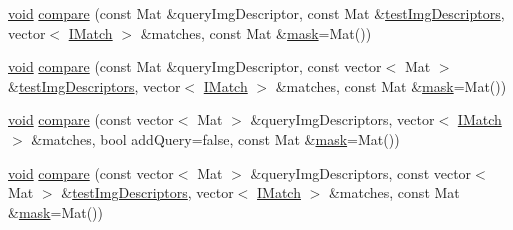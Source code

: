 \begin{DoxyCompactItemize}
\item 
\hyperlink{legacy_8hpp_a8bb47f092d473522721002c86c13b94e}{void} \hyperlink{classcv_1_1of2_1_1FabMap_ab1d5d6016bb012155090dd2d17085463}{compare} (const Mat \&query\-Img\-Descriptor, const Mat \&\hyperlink{classcv_1_1of2_1_1FabMap_a46f350e86965ec1e00ae4bd629dd4c8d}{test\-Img\-Descriptors}, vector$<$ \hyperlink{structcv_1_1of2_1_1IMatch}{I\-Match} $>$ \&matches, const Mat \&\hyperlink{tracking_8hpp_a6b13ecd2fd6ec7ad422f1d7863c3ad19}{mask}=Mat())
\item 
\hyperlink{legacy_8hpp_a8bb47f092d473522721002c86c13b94e}{void} \hyperlink{classcv_1_1of2_1_1FabMap_a1f7bf108d1fb50ed80d96e61982f5d2c}{compare} (const Mat \&query\-Img\-Descriptor, const vector$<$ Mat $>$ \&\hyperlink{classcv_1_1of2_1_1FabMap_a46f350e86965ec1e00ae4bd629dd4c8d}{test\-Img\-Descriptors}, vector$<$ \hyperlink{structcv_1_1of2_1_1IMatch}{I\-Match} $>$ \&matches, const Mat \&\hyperlink{tracking_8hpp_a6b13ecd2fd6ec7ad422f1d7863c3ad19}{mask}=Mat())
\item 
\hyperlink{legacy_8hpp_a8bb47f092d473522721002c86c13b94e}{void} \hyperlink{classcv_1_1of2_1_1FabMap_a38b53d2849eceee3bf4a8b9a9500f456}{compare} (const vector$<$ Mat $>$ \&query\-Img\-Descriptors, vector$<$ \hyperlink{structcv_1_1of2_1_1IMatch}{I\-Match} $>$ \&matches, bool add\-Query=false, const Mat \&\hyperlink{tracking_8hpp_a6b13ecd2fd6ec7ad422f1d7863c3ad19}{mask}=Mat())
\item 
\hyperlink{legacy_8hpp_a8bb47f092d473522721002c86c13b94e}{void} \hyperlink{classcv_1_1of2_1_1FabMap_a0a3ddfd621e54904cec1d8bf20c2f8b6}{compare} (const vector$<$ Mat $>$ \&query\-Img\-Descriptors, const vector$<$ Mat $>$ \&\hyperlink{classcv_1_1of2_1_1FabMap_a46f350e86965ec1e00ae4bd629dd4c8d}{test\-Img\-Descriptors}, vector$<$ \hyperlink{structcv_1_1of2_1_1IMatch}{I\-Match} $>$ \&matches, const Mat \&\hyperlink{tracking_8hpp_a6b13ecd2fd6ec7ad422f1d7863c3ad19}{mask}=Mat())
\end{DoxyCompactItemize}
